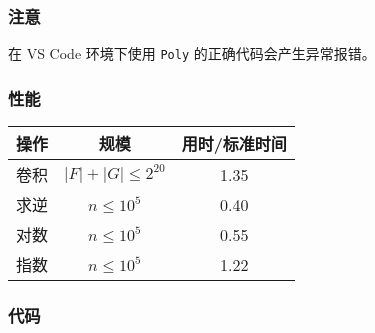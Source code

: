 \subsubsection{注意}

在 VS Code 环境下使用 \lstinline{Poly} 的正确代码会产生异常报错。

\subsubsection{性能}

\begin{tabular}{|c|c|c|}
\hline
操作 & 规模 & 用时/标准时间 \\
\hline
卷积 & $|F| + |G| \le 2^{20}$ & 1.35 \\
\hline
求逆 & $n \le 10^5$ & 0.40 \\
\hline
对数 & $n \le 10^5$ & 0.55 \\
\hline
指数 & $n \le 10^5$ & 1.22 \\
\hline
\end{tabular}

\newpage

\subsubsection{代码}


